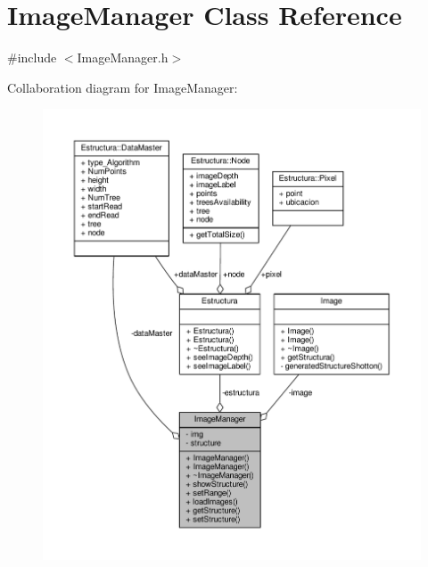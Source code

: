 \hypertarget{classImageManager}{}\section{Image\+Manager Class Reference}
\label{classImageManager}


{\ttfamily \#include $<$Image\+Manager.\+h$>$}



Collaboration diagram for Image\+Manager\+:
\nopagebreak
\begin{figure}[H]
\begin{center}
\leavevmode
\includegraphics[width=350pt]{classImageManager__coll__graph}
\end{center}
\end{figure}
